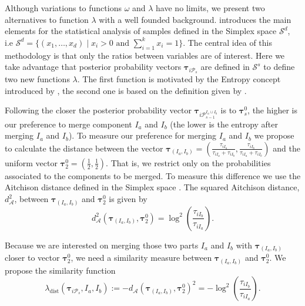 \documentclass[submit]{smj}
\theoremstyle{definition}
\newcommand{\m}[1]{\boldsymbol{#1}}
\begin{document}
Although variations to functions $\omega$ and $\lambda$ have no limits, we present two alternatives to function $\lambda$ with a well founded background. \cite{aitchison1986statistical} introduces the main elements for the statistical analysis of samples defined in the Simplex space $\mathcal{S}^d$, i.e $\mathcal{S}^d = \{ (x_1,\dots, x_d) \;|\; x_i > 0 \text{ and } \sum_{i=1}^k x_i = 1 \}$. The central idea of this methodology is that only the ratios between variables are of interest. Here we take advantage that posterior probability vectors $\m\tau_{i\mathcal{P}_s}$ are defined in $\mathcal{S}^s$ to define two new functions $\lambda$. The first function is motivated by the Entropy concept introduced by \cite{baudry2010combining}, the second one is based on the definition given by \cite{longford2014}.


Following \cite{baudry2010combining} the closer the posterior probability vector $\m\tau_{i \mathcal{P}_{s-1}^{I_a\cup I_b}}$ is to $\m\tau_s^0$, the higher is our preference to merge component $I_a$ and $I_b$ (the lower is the entropy after merging $I_a$ and $I_b$). To measure our preference for merging $I_a$ and $I_b$ we propose to calculate the distance between the vector $\m\tau_{\left(I_a, I_b\right)} = (\frac{\tau_{i I_a}}{\tau_{i I_a} + \tau_{i I_b}}, \frac{\tau_{i I_b}}{\tau_{i I_a} + \tau_{i I_b}})$ and the uniform vector $\m\tau_2^0=\left(\frac{1}{2}, \frac{1}{2}\right)$. That is, we restrict only on the probabilities associated to the components to be merged. To measure this difference we use the Aitchison distance defined in the Simplex space  \citep{palarea2012dealing}. The squared Aitchison distance, $d_\mathcal{A}^2$, between $\m\tau_{\left(I_a, I_b\right)}$ and $\m\tau_2^0$ is given by
\[
d_\mathcal{A}^2\left(\m\tau_{\left(I_a, I_b\right)}, \m\tau_2^0 \right) = \log^2 \left(\frac{ \tau_{iI_b} }{ \tau_{iI_a} }\right).
\]

Because we are interested on merging those two parts  $I_a$ and $I_b$ with $\m\tau_{\left(I_a, I_b\right)}$ closer to vector $\m\tau_2^0$, we need a similarity measure between $\m\tau_{\left(I_a, I_b\right)}$ and $\m\tau_2^0$. We propose the similarity function
\[
\lambda_{\text{dist}}(\m\tau_{i \mathcal{P}_s},  I_a,  I_b) := -d_\mathcal{A}\left(\m\tau_{\left(I_a, I_b\right)}, \m\tau_2^0 \right)^2 = -\log^2 \left(\frac{ \tau_{iI_b} }{ \tau_{iI_a} }\right).
\]
\end{document}
